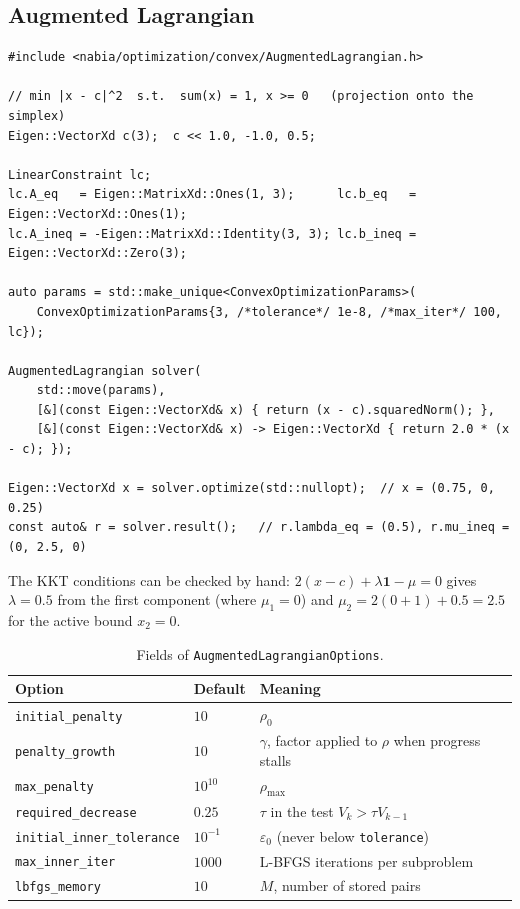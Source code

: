 \documentclass[11pt,a4paper]{article}
\begin{document}
\subsection{Augmented Lagrangian}
\begin{lstlisting}
#include <nabia/optimization/convex/AugmentedLagrangian.h>

// min |x - c|^2  s.t.  sum(x) = 1, x >= 0   (projection onto the simplex)
Eigen::VectorXd c(3);  c << 1.0, -1.0, 0.5;

LinearConstraint lc;
lc.A_eq   = Eigen::MatrixXd::Ones(1, 3);      lc.b_eq   = Eigen::VectorXd::Ones(1);
lc.A_ineq = -Eigen::MatrixXd::Identity(3, 3); lc.b_ineq = Eigen::VectorXd::Zero(3);

auto params = std::make_unique<ConvexOptimizationParams>(
    ConvexOptimizationParams{3, /*tolerance*/ 1e-8, /*max_iter*/ 100, lc});

AugmentedLagrangian solver(
    std::move(params),
    [&](const Eigen::VectorXd& x) { return (x - c).squaredNorm(); },
    [&](const Eigen::VectorXd& x) -> Eigen::VectorXd { return 2.0 * (x - c); });

Eigen::VectorXd x = solver.optimize(std::nullopt);  // x = (0.75, 0, 0.25)
const auto& r = solver.result();   // r.lambda_eq = (0.5), r.mu_ineq = (0, 2.5, 0)
\end{lstlisting}
The KKT conditions can be checked by hand:
$2(x-c)+\lambda\mathbf{1}-\mu = 0$ gives $\lambda=0.5$ from the first
component (where $\mu_1=0$) and $\mu_2 = 2(0+1)+0.5=2.5$ for the active bound
$x_2=0$.

\begin{table}[ht]
\centering
\begin{tabular}{@{}llp{6.5cm}@{}}
\toprule
Option & Default & Meaning \\
\midrule
\texttt{initial\_penalty} & $10$ & $\rho_0$ \\
\texttt{penalty\_growth} & $10$ & $\gamma$, factor applied to $\rho$ when progress stalls \\
\texttt{max\_penalty} & $10^{10}$ & $\rho_{\max}$ \\
\texttt{required\_decrease} & $0.25$ & $\tau$ in the test $V_k>\tau V_{k-1}$ \\
\texttt{initial\_inner\_tolerance} & $10^{-1}$ & $\varepsilon_0$ (never below \texttt{tolerance}) \\
\texttt{max\_inner\_iter} & $1000$ & L-BFGS iterations per subproblem \\
\texttt{lbfgs\_memory} & $10$ & $M$, number of stored pairs \\
\bottomrule
\end{tabular}
\caption{Fields of \texttt{AugmentedLagrangianOptions}.}
\end{table}
\end{document}
